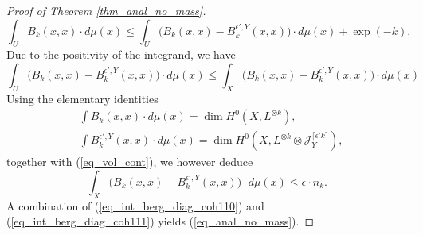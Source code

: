 \documentclass[12pt]{article}
\numberwithin{equation}{section}
\theoremstyle{theorem}
\theoremstyle{definition}
\theoremstyle{remark}
\begin{document}
\begin{proof}[Proof of Theorem \ref{thm_anal_no_mass}]
		\begin{equation}\label{eq_int_berg_diag_coh110}
			\int_U B_k(x, x) \cdot d \mu(x) \leq \int_U \big(B_k(x, x) - B_k^{\epsilon', Y}(x, x)\big)   \cdot d \mu(x) + \exp(-k).
		\end{equation}
		Due to the positivity of the integrand, we have
		\begin{equation}
		 	\int_U \big(B_k(x, x) - B_k^{\epsilon', Y}(x, x)\big)   \cdot d \mu(x) 
		 	\leq
		 	 \int_X \big(B_k(x, x) - B_k^{\epsilon', Y}(x, x)\big)   \cdot d \mu(x) 
		\end{equation}
		Using the elementary identities
		\begin{equation}\label{eq_int_berg_diag_coh}
		\begin{aligned}
		& \int B_k(x, x) \cdot d\mu(x) = \dim H^0(X, L^{\otimes k}),
		\\ 
		& \int B_k^{\epsilon', Y}(x, x) \cdot d\mu(x) =  \dim H^0(X, L^{\otimes k} \otimes \mathcal{J}_{Y}^{\lceil \epsilon' k \rceil}),
		\end{aligned}
		\end{equation}
		together with (\ref{eq_vol_cont}), we however deduce
		\begin{equation}\label{eq_int_berg_diag_coh111}
			 \int_X \big(B_k(x, x) - B_k^{\epsilon', Y}(x, x)\big)   \cdot d \mu(x) 
			 \leq
			 \epsilon \cdot n_k.
		\end{equation}		 
		A combination of (\ref{eq_int_berg_diag_coh110}) and (\ref{eq_int_berg_diag_coh111}) yields (\ref{eq_anal_no_mass}).
	\end{proof}
	
	
\end{document}
